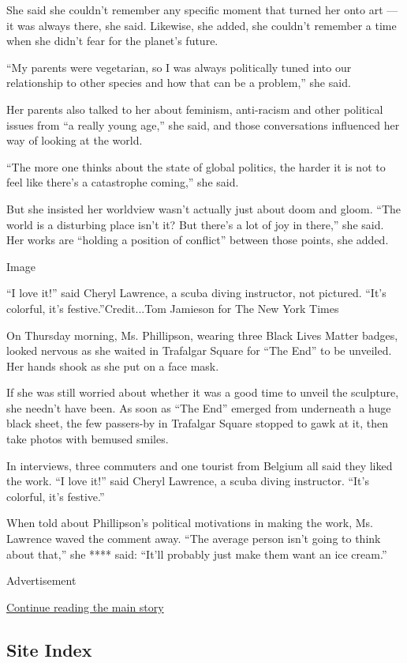 She said she couldn't remember any specific moment that turned her onto
art --- it was always there, she said. Likewise, she added, she couldn't
remember a time when she didn't fear for the planet's future.

``My parents were vegetarian, so I was always politically tuned into our
relationship to other species and how that can be a problem,'' she said.

Her parents also talked to her about feminism, anti-racism and other
political issues from ``a really young age,'' she said, and those
conversations influenced her way of looking at the world.

``The more one thinks about the state of global politics, the harder it
is not to feel like there's a catastrophe coming,'' she said.

But she insisted her worldview wasn't actually just about doom and
gloom. ``The world is a disturbing place isn't it? But there's a lot of
joy in there,'' she said. Her works are ``holding a position of
conflict'' between those points, she added.

Image

``I love it!'' said Cheryl Lawrence, a scuba diving instructor, not
pictured. ``It's colorful, it's festive.''Credit...Tom Jamieson for The
New York Times

On Thursday morning, Ms. Phillipson, wearing three Black Lives Matter
badges, looked nervous as she waited in Trafalgar Square for ``The End''
to be unveiled. Her hands shook as she put on a face mask.

If she was still worried about whether it was a good time to unveil the
sculpture, she needn't have been. As soon as ``The End'' emerged from
underneath a huge black sheet, the few passers-by in Trafalgar Square
stopped to gawk at it, then take photos with bemused smiles.

In interviews, three commuters and one tourist from Belgium all said
they liked the work. ``I love it!'' said Cheryl Lawrence, a scuba diving
instructor. ``It's colorful, it's festive.''

When told about Phillipson's political motivations in making the work,
Ms. Lawrence waved the comment away. ``The average person isn't going to
think about that,'' she **** said: ``It'll probably just make them want
an ice cream.''

Advertisement

\protect\hyperlink{after-bottom}{Continue reading the main story}

\hypertarget{site-index}{%
\subsection{Site Index}\label{site-index}}

